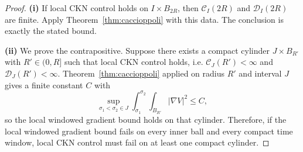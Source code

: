 \documentclass[11pt]{amsart}
\theoremstyle{plain}
\theoremstyle{definition}
\begin{document}
\begin{proof}
\textbf{(i)} If local CKN control holds on $I\times B_{2R}$, then
$\mathcal C_I(2R)$ and $\mathcal D_I(2R)$ are finite. Apply Theorem~\ref{thm:caccioppoli}
with this data. The conclusion is exactly the stated bound.

\textbf{(ii)} We prove the contrapositive. Suppose there exists a compact cylinder
$J\times B_{R'}$ with $R'\in(0,R]$ such that local CKN control holds, i.e.
$\mathcal C_J(R')<\infty$ and $\mathcal D_J(R')<\infty$. Theorem~\ref{thm:caccioppoli}
applied on radius $R'$ and interval $J$ gives a finite constant $C$ with
\[
\sup_{\sigma_1<\sigma_2\in J}\int_{\sigma_1}^{\sigma_2}\int_{B_{R'}}|\nabla V|^2\le C,
\]
so the local windowed gradient bound holds on that cylinder. Therefore, if the local windowed gradient bound
fails on every inner ball and every compact time window, local CKN control must fail on at least
one compact cylinder.
\end{proof}



\end{document}
